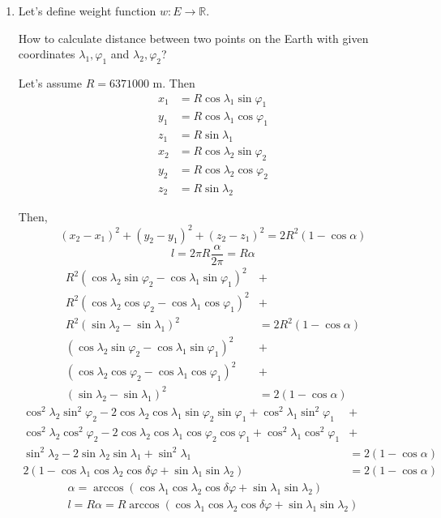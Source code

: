 \documentclass[12pt, a4paper]{article}
\begin{document}
\begin{enumerate}[label=\alph*)]
\item Let's define weight function \(w : E \to \mathbb{R}\).

How to calculate distance between two points on the Earth with given coordinates \(\lambda_1, \varphi_1\) and \(\lambda_2, \varphi_2\)?

Let's assume \(R = 6371000\) m. Then
\begin{align*}
x_1 &= R\cos\lambda_1\sin\varphi_1 \\
y_1 &= R\cos\lambda_1\cos\varphi_1 \\
z_1 &= R\sin\lambda_1 \\
x_2 &= R\cos\lambda_2\sin\varphi_2 \\
y_2 &= R\cos\lambda_2\cos\varphi_2 \\
z_2 &= R\sin\lambda_2
\end{align*}

Then,
\[(x_2 - x_1)^2 + (y_2 - y_1)^2 + (z_2 - z_1)^2 = 2 R^2 (1 - \cos\alpha)\]
\[l = 2 \pi R \frac{\alpha}{2 \pi} = R \alpha\]
\begin{align*}
R^2 (\cos\lambda_2\sin\varphi_2 - \cos\lambda_1\sin\varphi_1)^2 &+ \\
R^2 (\cos\lambda_2\cos\varphi_2 - \cos\lambda_1\cos\varphi_1)^2 &+ \\
R^2 (\sin\lambda_2 - \sin\lambda_1)^2 &= 2 R^2 (1 - \cos\alpha) \\
(\cos\lambda_2\sin\varphi_2 - \cos\lambda_1\sin\varphi_1)^2 &+ \\
(\cos\lambda_2\cos\varphi_2 - \cos\lambda_1\cos\varphi_1)^2 &+ \\
(\sin\lambda_2 - \sin\lambda_1)^2 &= 2 (1 - \cos\alpha)
\end{align*}
\begin{align*}
\cos^2\lambda_2\sin^2\varphi_2 - 2\cos\lambda_2\cos\lambda_1\sin\varphi_2\sin\varphi_1 + \cos^2\lambda_1\sin^2\varphi_1 &+ \\
\cos^2\lambda_2\cos^2\varphi_2 - 2\cos\lambda_2\cos\lambda_1\cos\varphi_2\cos\varphi_1 + \cos^2\lambda_1\cos^2\varphi_1 &+ \\
\sin^2\lambda_2 - 2\sin\lambda_2\sin\lambda_1 + \sin^2\lambda_1 &= 2 (1 - \cos\alpha) \\
2 (1 - \cos\lambda_1\cos\lambda_2\cos\delta\varphi + \sin\lambda_1\sin\lambda_2) &= 2 (1 - \cos\alpha)
\end{align*}
\begin{align*}
\alpha = \arccos(\cos\lambda_1\cos\lambda_2\cos\delta\varphi + \sin\lambda_1\sin\lambda_2) \\
l = R\alpha = R\arccos(\cos\lambda_1\cos\lambda_2\cos\delta\varphi + \sin\lambda_1\sin\lambda_2)
\end{align*}


\end{enumerate}
\end{document}
